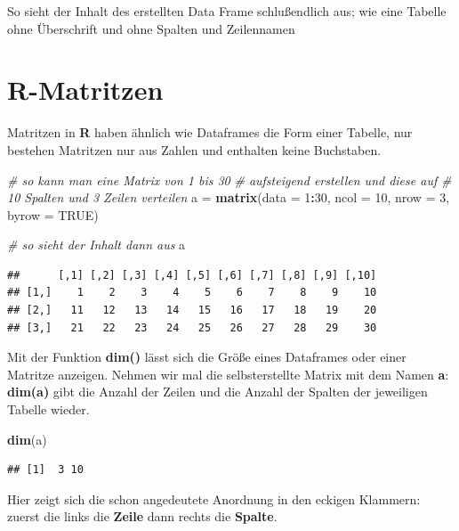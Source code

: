 \documentclass[]{book}
\newenvironment{Shaded}{\begin{snugshade}}{\end{snugshade}}
\newcommand{\KeywordTok}[1]{\textcolor[rgb]{0.13,0.29,0.53}{\textbf{#1}}}
\newcommand{\DataTypeTok}[1]{\textcolor[rgb]{0.13,0.29,0.53}{#1}}
\newcommand{\DecValTok}[1]{\textcolor[rgb]{0.00,0.00,0.81}{#1}}
\newcommand{\StringTok}[1]{\textcolor[rgb]{0.31,0.60,0.02}{#1}}
\newcommand{\CommentTok}[1]{\textcolor[rgb]{0.56,0.35,0.01}{\textit{#1}}}
\newcommand{\OtherTok}[1]{\textcolor[rgb]{0.56,0.35,0.01}{#1}}
\newcommand{\OperatorTok}[1]{\textcolor[rgb]{0.81,0.36,0.00}{\textbf{#1}}}
\newcommand{\NormalTok}[1]{#1}
\begin{document}
So sieht der Inhalt des erstellten Data Frame schlußendlich aus; wie
eine Tabelle ohne Überschrift und ohne Spalten und Zeilennamen

\section{R-Matritzen}\label{r-matritzen}

Matritzen in \textbf{R} haben ähnlich wie Dataframes die Form einer
Tabelle, nur bestehen Matritzen nur aus Zahlen und enthalten keine
Buchstaben.

\begin{Shaded}
\begin{Highlighting}[]
\CommentTok{# so kann man eine Matrix von 1 bis 30 }
\CommentTok{# aufsteigend erstellen und diese auf }
\CommentTok{# 10 Spalten und 3 Zeilen verteilen}
\NormalTok{a =}\StringTok{ }\KeywordTok{matrix}\NormalTok{(}\DataTypeTok{data =} \DecValTok{1}\OperatorTok{:}\DecValTok{30}\NormalTok{, }\DataTypeTok{ncol =} \DecValTok{10}\NormalTok{, }\DataTypeTok{nrow =} \DecValTok{3}\NormalTok{, }\DataTypeTok{byrow =} \OtherTok{TRUE}\NormalTok{)}

\CommentTok{# so sieht der Inhalt dann aus}
\NormalTok{a}
\end{Highlighting}
\end{Shaded}

\begin{verbatim}
##      [,1] [,2] [,3] [,4] [,5] [,6] [,7] [,8] [,9] [,10]
## [1,]    1    2    3    4    5    6    7    8    9    10
## [2,]   11   12   13   14   15   16   17   18   19    20
## [3,]   21   22   23   24   25   26   27   28   29    30
\end{verbatim}

Mit der Funktion \textbf{dim()} lässt sich die Größe eines Dataframes
oder einer Matritze anzeigen. Nehmen wir mal die selbsterstellte Matrix
mit dem Namen \textbf{a}: \textbf{dim(a)} gibt die Anzahl der Zeilen und
die Anzahl der Spalten der jeweiligen Tabelle wieder.

\begin{Shaded}
\begin{Highlighting}[]
\KeywordTok{dim}\NormalTok{(a)}
\end{Highlighting}
\end{Shaded}

\begin{verbatim}
## [1]  3 10
\end{verbatim}

Hier zeigt sich die schon angedeutete Anordnung in den eckigen Klammern:
zuerst die links die \textbf{Zeile} dann rechts die \textbf{Spalte}.
\end{document}
